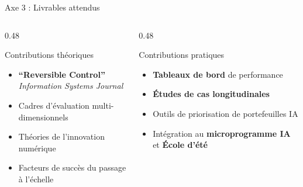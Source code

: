 \documentclass[aspectratio=169,11pt]{beamer}
\begin{document}
\begin{frame}{Axe 3 : Livrables attendus}
  \begin{columns}[T]
    \begin{column}{0.48\textwidth}
      \begin{block}{Contributions théoriques}
        \begin{itemize}\small
          \item \textbf{``Reversible Control''}\\
          {\footnotesize\textit{Information Systems Journal}}
          \item Cadres d'évaluation multi-dimensionnels
          \item Théories de l'innovation numérique
          \item Facteurs de succès du passage à l'échelle
        \end{itemize}
      \end{block}
    \end{column}
    \begin{column}{0.48\textwidth}
      \begin{block}{Contributions pratiques}
        \begin{itemize}\small
          \item \textbf{Tableaux de bord} de performance
          \item \textbf{Études de cas longitudinales}
          \item Outils de priorisation de portefeuilles IA
          \item Intégration au \textbf{microprogramme IA} et \textbf{École d'été}
        \end{itemize}
      \end{block}
    \end{column}
  \end{columns}
  
  \vspace{0.5em}
  
  \begin{center}
  \end{center}
\end{frame}
\end{document}
